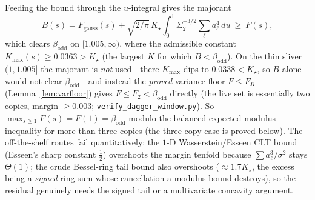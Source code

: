 Feeding the bound through the $u$-integral gives the majorant
\[
  B(s)=F_{\mathrm{gauss}}(s)+\sqrt{2/\pi}\,K_\star\int_0^1\Sigma_2^{-3/2}\textstyle\sum_\ell a_\ell^4\,du\ \ge\ F(s),
\]
which clears $\beta_{\mathrm{odd}}$ on $[1.005,\infty)$, where the admissible constant
$K_{\max}(s)\ge0.0363>K_\star$ (the largest $K$ for which $B<\beta_{\mathrm{odd}}$).
On the thin sliver $(1,1.005]$ the majorant is \emph{not} used---there $K_{\max}$ dips to $0.0338<K_\star$, so
$B$ alone would not clear $\beta_{\mathrm{odd}}$---and instead the \emph{proved} variance floor $F\le F_K$
(Lemma~\ref{lem:varfloor}) gives $F\le F_2<\beta_{\mathrm{odd}}$ directly (the live set is essentially two
copies, margin $\ge0.003$; \texttt{verify\_dagger\_window.py}). So $\max_{s\ge1}F(s)=F(1)=\beta_{\mathrm{odd}}$
modulo the balanced expected-modulus inequality for more than three copies (the three-copy case is proved
below). The off-the-shelf routes fail
quantitatively: the $1$-D Wasserstein/Esseen CLT bound (Esseen's sharp constant $\tfrac12$) overshoots the
margin tenfold because $\sum a_\ell^3/\sigma^2$ stays $\Theta(1)$; the crude Bessel-ring tail bound also
overshoots ($\approx1.7K_\star$, the excess being a \emph{signed} ring sum whose cancellation a modulus bound
destroys), so the residual genuinely needs the signed tail or a multivariate concavity argument.

